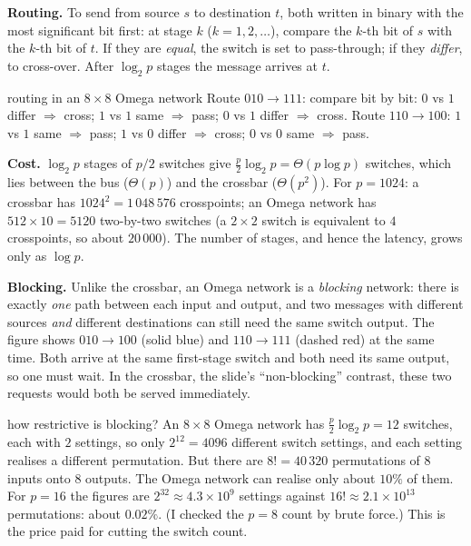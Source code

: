 \textbf{Routing.} To send from source $s$ to destination $t$, both written in binary with the most significant bit first: at stage $k$ ($k=1,2,\dots$), compare the
$k$-th bit of $s$ with the $k$-th bit of $t$. If they are \emph{equal}, the switch is set to pass-through; if they \emph{differ}, to cross-over. After $\log_2 p$
stages the message arrives at $t$.

\begin{workedex}{routing in an $8\times 8$ Omega network}
Route $010\to111$: compare bit by bit: $0$ vs $1$ differ $\Rightarrow$ cross; $1$ vs $1$ same $\Rightarrow$ pass; $0$ vs $1$ differ $\Rightarrow$ cross.
Route $110\to100$: $1$ vs $1$ same $\Rightarrow$ pass; $1$ vs $0$ differ $\Rightarrow$ cross; $0$ vs $0$ same $\Rightarrow$ pass.
\end{workedex}

\begin{center}

\end{center}

\textbf{Cost.} $\log_2 p$ stages of $p/2$ switches give $\tfrac p2\log_2 p=\Theta(p\log p)$ switches, which lies between the bus ($\Theta(p)$) and the
crossbar ($\Theta(p^{2})$). For $p=1024$: a crossbar has $1024^2=1\,048\,576$ crosspoints; an Omega network has
$512\times 10=5120$ two-by-two switches (a $2\times2$ switch is equivalent to $4$ crosspoints, so about $20\,000$). The number of stages, and hence the latency, grows only as $\log p$.

\textbf{Blocking.} Unlike the crossbar, an Omega network is a \emph{blocking} network: there is exactly \emph{one} path between each input and output, and two messages with
different sources \emph{and} different destinations can still need the same switch output.
The figure shows $010\to100$ (solid blue) and $110\to111$ (dashed red) at the same time. Both arrive at the same first-stage switch and both need its
same output, so one must wait. In the crossbar, the slide's ``non-blocking'' contrast, these two requests would both be served immediately.

\begin{workedex}{how restrictive is blocking?}
An $8\times8$ Omega network has $\tfrac p2\log_2 p=12$ switches, each with $2$ settings, so only $2^{12}=4096$ different switch settings, and each setting
realises a different permutation. But there are $8!=40\,320$ permutations of $8$ inputs onto $8$ outputs. The Omega network can realise only
about $10\%$ of them. For $p=16$ the figures are $2^{32}\approx4.3\times10^{9}$ settings against $16!\approx2.1\times10^{13}$ permutations: about $0.02\%$. (I checked the $p=8$ count by
brute force.) This is the price paid for cutting the switch count.
\end{workedex}

